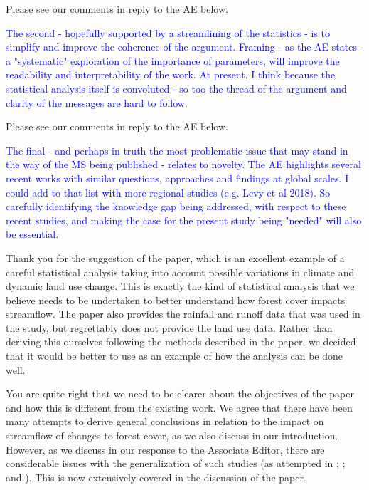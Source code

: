 \documentclass[]{elsarticle} %
\begin{document}
Please see our comments in reply to the AE below.

\textcolor{blue}{The second - hopefully supported by a streamlining of the statistics - is to simplify and improve the coherence of the argument.  Framing - as the AE states - a "systematic" exploration of the importance of parameters, will improve the readability and interpretability of the work.  At present, I think because the statistical analysis itself is convoluted - so too the thread of the argument and clarity of the messages are hard to follow.}

Please see our comments in reply to the AE below.

\textcolor{blue}{The final - and perhaps in truth the most problematic issue that may stand in the way of the MS being published - relates to novelty.  The AE highlights several recent works with similar questions, approaches and findings at global scales.  I could add to that list with more regional studies (e.g. Levy et al 2018).  So carefully identifying the knowledge gap being addressed, with respect to these recent studies, and making the case for the present study being "needed" will also be essential.}

Thank you for the suggestion of the \citet{levy2018} paper, which is an excellent example of a careful statistical analysis taking into account possible variations in climate and dynamic land use change. This is exactly the kind of statistical analysis that we believe needs to be undertaken to better understand how forest cover impacts streamflow. The paper also provides the rainfall and runoff data that was used in the study, but regrettably does not provide the land use data. Rather than deriving this ourselves following the methods described in the paper, we decided that it would be better to use \citet{levy2018} as an example of how the analysis can be done well.

You are quite right that we need to be clearer about the objectives of the paper and how this is different from the existing work. We agree that there have been many attempts to derive general conclusions in relation to the impact on streamflow of changes to forest cover, as we also discuss in our introduction. However, as we discuss in our response to the Associate Editor, there are considerable issues with the generalization of such studies (as attempted in \citet{zhou2015}; \citet{jackson2005}; \citet{filoso2017} and \citet{zhang2017}). This is now extensively covered in the discussion of the paper.
\end{document}
